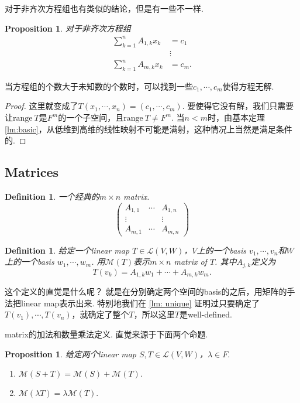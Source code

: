 \documentclass{article}
\newtheorem{proposition}[theorem]{Proposition}
\newtheorem{definition}[theorem]{Definition}
\newcommand\range[1]{\text{range}\ #1}
\begin{document}
{\color{red} 对于非齐次方程组也有类似的结论，但是有一些不一样}.

\begin{proposition}
对于非齐次方程组
$$
\begin{aligned}
\sum\limits_{k=1}^{n}A_{1,k}x_k&=c_1 \\
&\vdots\\
\sum\limits_{k=1}^{n}A_{m,k}x_k&=c_m.
\end{aligned}
$$
\end{proposition}
当方程组的个数大于未知数的个数时，可以找到一些$c_1,\cdots,c_m$使得方程无解.

\begin{proof}
这里就变成了$T(x_1,\cdots,x_n) =  (c_1,\cdots,c_m)$. 要使得它没有解，我们只需要让$\range{T}$是$F^m$的一个子空间，且$\range{T} \neq F^m$. 当$n < m$时，由基本定理\ref{lm:basic}，从低维到高维的线性映射不可能是满射，这种情况上当然是满足条件的.
\end{proof}

\newpage
\subsection{Matrices}

\begin{definition}
\rm 一个经典的$m \times n$ matrix.
$$
\begin{pmatrix}
A_{1,1} & \cdots & A_{1,n} \\
\vdots & & \vdots \\
A_{m,1} & \cdots & A_{m,n}
\end{pmatrix}
$$
\end{definition}

\begin{definition}
\rm 给定一个linear map $T \in \mathcal{L}(V,W)$，$V$上的一个basis $v_1,\cdots,v_n$和$W$上的一个basis $w_1,\cdots,w_m$. 用$\mathcal{M}(T)$表示$m \times n$ matrix of $T$. 其中$A_{j,k}$定义为
$$
T(v_k) = A_{1,k}w_1 +  \cdots + A_{m,k}w_m.
$$
\end{definition}

这个定义的直觉是什么呢？ {\color{blue}就是在分别确定两个空间的basis的之后，用矩阵的手法把linear map表示出来}. 特别地我们在 \ref{lm: unique} 证明过只要确定了$T(v_1),\cdots,T(v_n)$，就确定了整个$T$，所以这里$T$是well-defined. 

{\color{red} matrix的加法和数量乘法定义}. 直觉来源于下面两个命题.

\begin{proposition}
\rm 给定两个linear map $S,T \in \mathcal{L}(V,W)$，$\lambda \in F.$
\begin{enumerate}
	\item $\mathcal{M}(S+T) = \mathcal{M}(S) + \mathcal{M}(T).$
	\item $\mathcal{M}(\lambda T) = \lambda \mathcal{M}(T).$
\end{enumerate}
\end{proposition}
\end{document}
